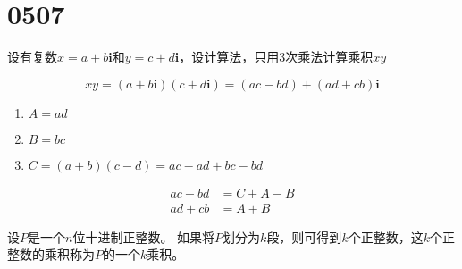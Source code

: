 \section{0507}\label{sec:0507}
\begin{questions}
    \question 设有复数$x=a+b \bm i$和$y=c+d \bm i$，设计算法，只用3次乘法计算乘积$xy$
    \begin{solution}
        \[
            xy = (a+b \bm i) (c+d \bm i) = (ac-bd) + (ad+cb) \bm i
        \]
        \begin{enumerate}
            \item $A = ad                             $
            \item $B = bc                             $
            \item $C = (a+b)(c-d) = ac - ad + bc - bd $
        \end{enumerate}
        \begin{align*}
            ac-bd & = C + A - B \\
            ad+cb & = A + B
        \end{align*}
    \end{solution}

    \question 设$P$是一个$n$位十进制正整数。
    如果将$P$划分为$k$段，则可得到$k$个正整数，这$k$个正整数的乘积称为$P$的一个$k$乘积。
\end{questions}

